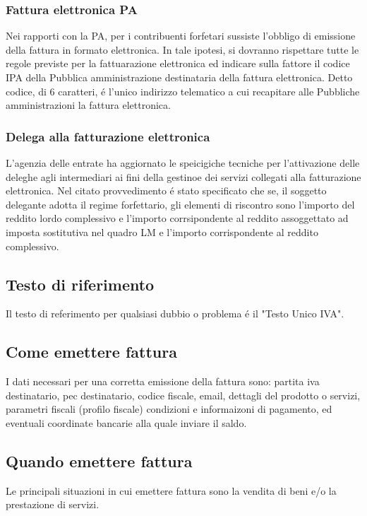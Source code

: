 \documentclass{article}
\begin{document}
\subsubsection{Fattura elettronica PA}
Nei rapporti con la PA, per i contribuenti forfetari sussiste l'obbligo di emissione della fattura in formato elettronica. In tale ipotesi, si dovranno rispettare tutte le regole previste per la fattuarazione elettronica ed indicare sulla fattore il codice IPA della Pubblica amministrazione destinataria della fattura elettronica. Detto codice, di 6 caratteri, \'e l'unico indirizzo telematico a cui recapitare alle Pubbliche amministrazioni la fattura elettronica. 

\subsubsection{Delega alla fatturazione elettronica}
L'agenzia delle entrate ha aggiornato le speicigiche tecniche per l'attivazione delle deleghe agli intermediari ai fini della gestinoe dei servizi collegati alla fatturazione elettronica. Nel citato provvedimento \'e stato specificato che se, il soggetto delegante adotta il regime forfettario, gli elementi di riscontro sono l'importo del reddito lordo complessivo e l'importo corrsipondente al reddito assoggettato ad imposta sostitutiva nel quadro LM e l'importo corrispondente al reddito complessivo.

\subsection{Testo di riferimento}
Il testo di referimento per qualsiasi dubbio o problema \'e il "Testo Unico IVA".

\subsection{Come emettere fattura}
I dati necessari per una corretta emissione della fattura sono: partita iva destinatario, pec destinatario, codice fiscale, email, 
dettagli del prodotto o servizi, parametri fiscali (profilo fiscale) condizioni e informaizoni di pagamento, ed eventuali coordinate bancarie alla quale inviare il saldo.


\subsection{Quando emettere fattura}
Le principali situazioni in cui emettere fattura sono la vendita di beni e/o la prestazione di servizi. 
\end{document}
